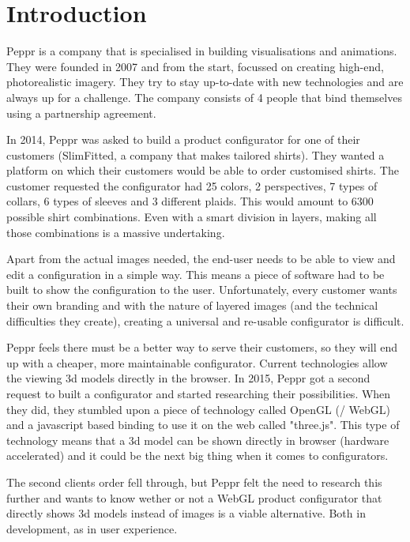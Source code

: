 \chapter{Introduction}

Peppr is a company that is specialised in building visualisations and animations. They were founded in 2007 and from the start, focussed on creating high-end, photorealistic imagery. They try to stay up-to-date with new technologies and are always up for a challenge. The company consists of 4 people that bind themselves using a partnership agreement.

In 2014, Peppr was asked to build a product configurator for one of their customers (SlimFitted, a company that makes tailored shirts). They wanted a platform on which their customers would be able to order customised shirts. The customer requested the configurator had 25 colors, 2 perspectives, 7 types of collars, 6 types of sleeves and 3 different plaids. This would amount to 6300 possible shirt combinations. Even with a smart division in layers, making all those combinations is a massive undertaking.

Apart from the actual images needed, the end-user needs to be able to view and edit a configuration in a simple way. This means a piece of software had to be built to show the configuration to the user. Unfortunately, every customer wants their own branding and with the nature of layered images (and the technical difficulties they create), creating a universal and re-usable configurator is difficult.

Peppr feels there must be a better way to serve their customers, so they will end up with a cheaper, more maintainable configurator. Current technologies allow the viewing 3d models directly in the browser. In 2015, Peppr got a second request to built a configurator and started researching their possibilities. When they did, they stumbled upon a piece of technology called OpenGL (/ WebGL) and a javascript based binding to use it on the web called "three.js". This type of technology means that a 3d model can be shown directly in browser (hardware accelerated) and it could be the next big thing when it comes to configurators.

The second clients order fell through, but Peppr felt the need to research this further and wants to know wether or not a WebGL product configurator that directly shows 3d models instead of images is a viable alternative. Both in development, as in user experience.






